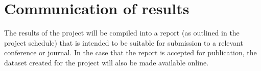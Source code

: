 \documentclass[11pt]{scrartcl} %
\begin{document}
    \section{Communication of results} {
        The results of the project will be compiled into a report (as outlined
        in the project schedule) that is intended to be suitable for
        submission to a relevant conference or journal. In the case that the
        report is accepted for publication, the dataset created for the
        project will also be made available online.
    }

	
	
\end{document}
